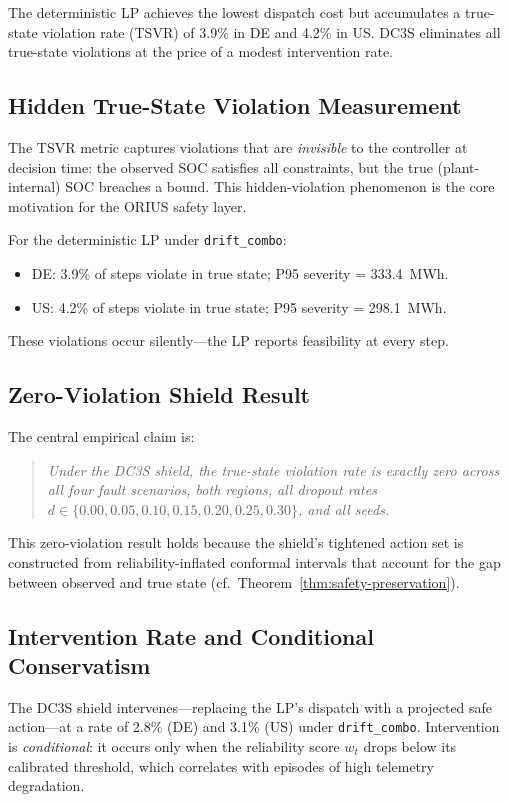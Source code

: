 The deterministic LP achieves the lowest dispatch cost but accumulates a
true-state violation rate (TSVR) of 3.9\% in DE and 4.2\% in US.
DC3S eliminates all true-state violations at the price of a modest
intervention rate.

\subsection{Hidden True-State Violation Measurement}

The TSVR metric captures violations that are \emph{invisible} to the
controller at decision time: the observed SOC satisfies all constraints,
but the true (plant-internal) SOC breaches a bound.  This hidden-violation
phenomenon is the core motivation for the ORIUS safety layer.

For the deterministic LP under \texttt{drift\_combo}:
\begin{itemize}
  \item DE: 3.9\% of steps violate in true state; P95 severity = 333.4~MWh.
  \item US: 4.2\% of steps violate in true state; P95 severity = 298.1~MWh.
\end{itemize}
These violations occur silently---the LP reports feasibility at every step.

\subsection{Zero-Violation Shield Result}

The central empirical claim is:
\begin{quote}
\emph{Under the DC3S shield, the true-state violation rate is exactly zero
across all four fault scenarios, both regions, all dropout rates
$d \in \{0.00, 0.05, 0.10, 0.15, 0.20, 0.25, 0.30\}$, and all seeds.}
\end{quote}
This zero-violation result holds because the shield's tightened action set
is constructed from reliability-inflated conformal intervals that account
for the gap between observed and true state
(cf.\ Theorem~\ref{thm:safety-preservation}).

\subsection{Intervention Rate and Conditional Conservatism}

The DC3S shield intervenes---replacing the LP's dispatch with a projected
safe action---at a rate of 2.8\% (DE) and 3.1\% (US) under
\texttt{drift\_combo}.  Intervention is \emph{conditional}: it occurs only
when the reliability score $w_t$ drops below its calibrated threshold,
which correlates with episodes of high telemetry degradation.

